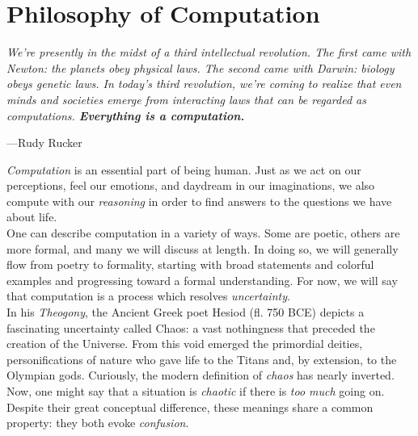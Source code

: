 
\part*{Philosophy of Computation}

\vspace{4mm}
\begin{displayquote}
	\textit{We're presently in the midst of a third intellectual revolution. The first came with Newton: the planets obey physical laws. The second came with Darwin: biology obeys genetic laws. In today’s third revolution, we're coming to realize that even minds and societies emerge from interacting laws that can be regarded as computations. \textbf{Everything is a computation.}}
	\vspace{2mm}
	\begin{flushright}
		---Rudy Rucker
	\end{flushright}
\end{displayquote}
\vspace{4mm}

\textit{Computation} is an essential part of being human. Just as we act on our perceptions, feel our emotions, and daydream in our imaginations, we also compute with our \textit{reasoning} in order to find answers to the questions we have about life. \\

One can describe computation in a variety of ways. Some are poetic, others are more formal, and many we will discuss at length. In doing so, we will generally flow from poetry to formality, starting with broad statements and colorful examples and progressing toward a formal understanding. For now, we will say that computation is a process which resolves \textit{uncertainty}. \\

In his \textit{Theogony}, the Ancient Greek poet Hesiod (fl. 750 BCE) depicts a fascinating uncertainty called Chaos: a vast nothingness that preceded the creation of the Universe. From this void emerged the primordial deities, personifications of nature who gave life to the Titans and, by extension, to the Olympian gods. Curiously, the modern definition of \textit{chaos} has nearly inverted. Now, one might say that a situation is \textit{chaotic} if there is \textit{too much} going on. Despite their great conceptual difference, these meanings share a common property: they both evoke \textit{confusion}. \\

